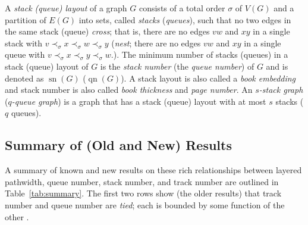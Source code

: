 \documentclass{jgaa-art}
\newcommand{\tabref}[1]{Table~\ref{tab:#1}}
\DeclareMathOperator{\sn}{sn}
\DeclareMathOperator{\qn}{qn}
\begin{document}
A \emph{stack (queue) layout} of a graph $G$ consists of a total order
$\sigma$ of $V(G)$ and a partition of $E(G)$ into  sets, called
\emph{stacks} (\emph{queues}), such that no two edges in the same
stack (queue) \emph{cross}; that is, there are no edges
$vw$ and $xy$ in a single stack with $v\prec_\sigma x\prec_\sigma w\prec_\sigma y$
(\emph{nest}; there are no edges $vw$ and $xy$ in a single queue with $v\prec_\sigma
x\prec_\sigma y\prec_\sigma w$.).  The minimum number of stacks (queues) in a
stack (queue) layout of $G$ is the \emph{stack number} (the
\emph{queue number}) of $G$ and is denoted as $\sn(G)$ ($\qn(G)$). A stack layout is also called a {\em book embedding} and stack number is also called {\em book thickness} and {\em page number}. An \emph{$s$-stack graph} (\emph{$q$-queue graph}) is a graph that has a stack (queue) layout with at most $s$ stacks ($q$ queues).

\subsection{Summary of (Old and New) Results}
A summary of known and new results on these rich relationships between layered pathwidth, queue number, stack number, and track number are outlined in \tabref{summary}.  The first two rows show (the older results) that track number and queue number are \emph{tied}; each is bounded by some function of the other \cite{dmw05,dpw04}.
\end{document}
